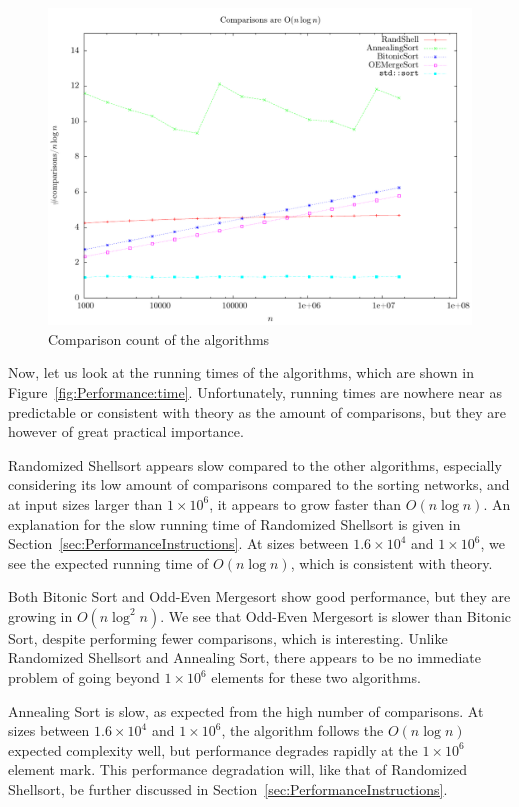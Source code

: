 \begin{figure}
\center
\includegraphics[width=\textwidth]{graphs/Performance/nlogncomparisons.pdf}
\caption{Comparison count of the algorithms}
\label{fig:Performance:comparisons}
\end{figure}


Now, let us look at the running times of the algorithms, which are shown in Figure~\ref{fig:Performance:time}.
Unfortunately, running times are nowhere near as predictable or consistent with theory as the amount of comparisons, but they are however of great practical importance.

Randomized Shellsort appears slow compared to the other algorithms, especially considering its low amount of comparisons compared to the sorting networks, and at input sizes larger than $1 \times 10^6$, it appears to grow faster than $O (n \log n)$. An explanation for the slow running time of Randomized Shellsort is given in Section~\ref{sec:PerformanceInstructions}. At sizes between $1.6 \times 10^4$ and $1 \times 10^6$, we see the expected running time of $O( n \log n)$, which is consistent with theory.

Both Bitonic Sort and Odd-Even Mergesort show good performance, but they are growing in $O ( n \log^2 n)$. We see that Odd-Even Mergesort is slower than Bitonic Sort, despite performing fewer comparisons, which is interesting. Unlike Randomized Shellsort and Annealing Sort, there appears to be no immediate problem of going beyond $1 \times 10^6$ elements for these two algorithms.

Annealing Sort is slow, as expected from the high number of comparisons. At sizes between $1.6 \times 10^4$ and $1 \times 10^6$, the algorithm follows the $O(n \log n)$ expected complexity well, but performance degrades rapidly at the $1 \times 10^6$ element mark. This performance degradation will, like that of Randomized Shellsort, be further discussed in Section~\ref{sec:PerformanceInstructions}.


